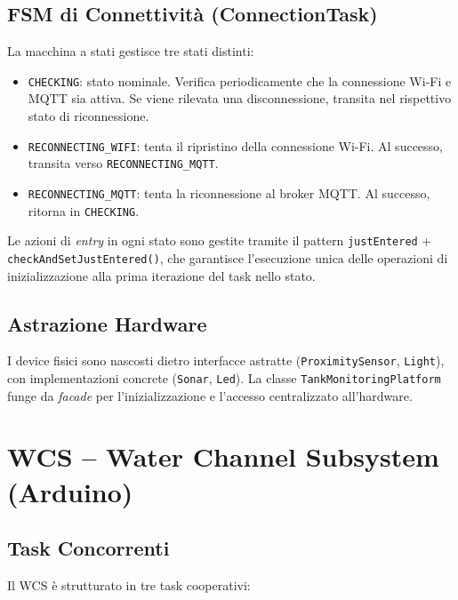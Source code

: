 \documentclass[12pt, a4paper]{article}
\begin{document}
\subsection{FSM di Connettività (ConnectionTask)}

La macchina a stati gestisce tre stati distinti:

\begin{itemize}
    \item \texttt{CHECKING}: stato nominale. Verifica periodicamente che la connessione Wi-Fi e MQTT sia attiva. Se viene rilevata una disconnessione, transita nel rispettivo stato di riconnessione.
    \item \texttt{RECONNECTING\_WIFI}: tenta il ripristino della connessione Wi-Fi. Al successo, transita verso \texttt{RECONNECTING\_MQTT}.
    \item \texttt{RECONNECTING\_MQTT}: tenta la riconnessione al broker MQTT. Al successo, ritorna in \texttt{CHECKING}.
\end{itemize}

Le azioni di \textit{entry} in ogni stato sono gestite tramite il pattern \texttt{justEntered} + \texttt{checkAndSetJustEntered()}, che garantisce l'esecuzione unica delle operazioni di inizializzazione alla prima iterazione del task nello stato.

\subsection{Astrazione Hardware}

I device fisici sono nascosti dietro interfacce astratte (\texttt{ProximitySensor}, \texttt{Light}), con implementazioni concrete (\texttt{Sonar}, \texttt{Led}). La classe \texttt{TankMonitoringPlatform} funge da \textit{facade} per l'inizializzazione e l'accesso centralizzato all'hardware.

\section{WCS -- Water Channel Subsystem (Arduino)}

\subsection{Task Concorrenti}

Il WCS è strutturato in tre task cooperativi:
\end{document}
